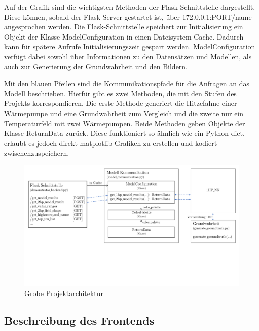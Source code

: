 \documentclass[a4paper]{extarticle}
\begin{document}
    Auf der Grafik sind die wichtigsten Methoden der Flask-Schnittstelle dargestellt.
    Diese können, sobald der Flask-Server gestartet ist, über 172.0.0.1:PORT/name angesprochen werden.
    Die Flask-Schnittstelle speichert zur Initialisierung ein Objekt der Klasse ModelConfiguration in einen Dateisystem-Cache.
    Dadurch kann für spätere Aufrufe Initialisierungszeit gespart werden.
    ModelConfiguration verfügt dabei sowohl über Informationen zu den Datensätzen und Modellen, als auch zur Generierung der Grundwahrheit und den Bildern.

    Mit den blauen Pfeilen sind die Kommunikationspfade für die Anfragen an das Modell beschrieben. 
    Hierfür gibt es zwei Methoden, die mit den Stufen des Projekts korrespondieren. 
    Die erste Methode generiert die Hitzefahne einer Wärmepumpe und eine Grundwahrheit zum Vergleich und die zweite nur ein Temperaturfeld mit zwei Wärmepumpen.
    Beide Methoden geben Objekte der Klasse ReturnData zurück. 
    Diese funktioniert so ähnlich wie ein Python dict, erlaubt es jedoch direkt matplotlib Grafiken zu erstellen und kodiert zwischenzuspeichern.

    
    \begin{figure}[H]
        \centering
        \includegraphics[trim={0cm 6cm 0cm 0}, clip, width=\linewidth]{bilder/architektur_backend.pdf}
        \caption{Grobe Projektarchitektur} \label{fig:architektur-backend}
    \end{figure}

    \subsection{Beschreibung des Frontends}
\end{document}
